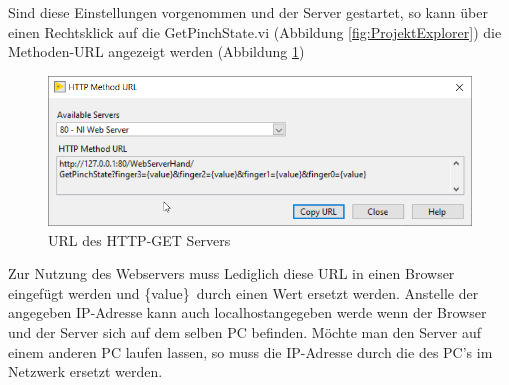 \documentclass[a4paper,12pt,final]{article} %
\numberwithin{equation}{section} %
\numberwithin{figure}{section} %
\numberwithin{table}{section} %
\begin{document}
Sind diese Einstellungen vorgenommen und der Server gestartet, so kann über einen Rechtsklick auf die GetPinchState.vi (Abbildung \ref{fig:ProjektExplorer}) die Methoden-URL angezeigt werden (Abbildung \ref{fig:HTTPMethod})
\begin{figure}[H]
	\begin{center}
		\includegraphics[width=12cm]{Bilder/HTTPMethod.png}
		\caption{URL des HTTP-GET Servers}
		\label{fig:HTTPMethod}
	\end{center}
\end{figure}
Zur Nutzung des Webservers muss Lediglich diese URL in einen Browser eingefügt werden und \glqq \{value\}\grqq\ durch einen Wert ersetzt werden.
Anstelle der angegeben IP-Adresse kann auch \glqq localhost\grqq angegeben werde wenn der Browser und der Server sich auf dem selben PC befinden.
Möchte man den Server auf einem anderen PC laufen lassen, so muss die IP-Adresse durch die des PC's im Netzwerk ersetzt werden.
\end{document}
